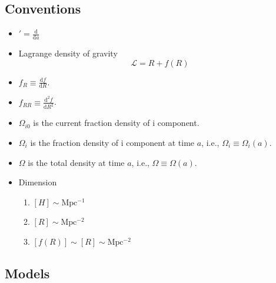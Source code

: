 \documentclass[12pt,a4paper]{article}
\begin{document}
\subsection{Conventions}
\begin{itemize}
\item
$'=\frac{\mathrm d}{\mathrm d a}$
\item
Lagrange density of gravity
\begin{equation}
\mathcal L=R+f(R)
\end{equation}

\item
$f_R\equiv \frac{\mathrm d f}{\mathrm d R}$.
\item
$f_{RR}\equiv \frac{\mathrm d^2 f}{\mathrm d R^2}$.

\item
$\Omega_{i0}$ is the current fraction density of i component.
\item
$\Omega_i$ is the fraction density of i component at time $a$, i.e., $\Omega_i\equiv \Omega_i(a)$.
\item
$\Omega$ is the total density at time $a$, i.e., $\Omega\equiv \Omega(a)$.

\item
Dimension
\begin{enumerate}
\item
$[H]\sim \mathrm{Mpc^{-1}}$
\item
$[R] \sim \mathrm{Mpc^{-2}}$
\item
$[f(R)]\sim [R] \sim \mathrm{Mpc^{-2}}$

\end{enumerate}

\end{itemize}






\subsection{Models}
\end{document}
